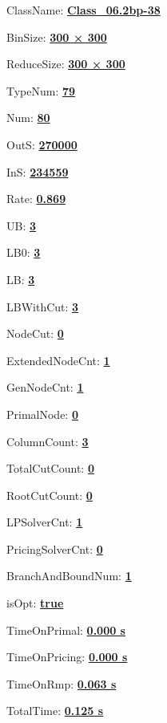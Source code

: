 \documentclass[11pt]{article}
\begin{document}
\pagestyle{empty}


ClassName: \underline{\textbf{Class_06.2bp-38}}
\par
BinSize: \underline{\textbf{300 × 300}}
\par
ReduceSize: \underline{\textbf{300 × 300}}
\par
TypeNum: \underline{\textbf{79}}
\par
Num: \underline{\textbf{80}}
\par
OutS: \underline{\textbf{270000}}
\par
InS: \underline{\textbf{234559}}
\par
Rate: \underline{\textbf{0.869}}
\par
UB: \underline{\textbf{3}}
\par
LB0: \underline{\textbf{3}}
\par
LB: \underline{\textbf{3}}
\par
LBWithCut: \underline{\textbf{3}}
\par
NodeCut: \underline{\textbf{0}}
\par
ExtendedNodeCnt: \underline{\textbf{1}}
\par
GenNodeCnt: \underline{\textbf{1}}
\par
PrimalNode: \underline{\textbf{0}}
\par
ColumnCount: \underline{\textbf{3}}
\par
TotalCutCount: \underline{\textbf{0}}
\par
RootCutCount: \underline{\textbf{0}}
\par
LPSolverCnt: \underline{\textbf{1}}
\par
PricingSolverCnt: \underline{\textbf{0}}
\par
BranchAndBoundNum: \underline{\textbf{1}}
\par
isOpt: \underline{\textbf{true}}
\par
TimeOnPrimal: \underline{\textbf{0.000 s}}
\par
TimeOnPricing: \underline{\textbf{0.000 s}}
\par
TimeOnRmp: \underline{\textbf{0.063 s}}
\par
TotalTime: \underline{\textbf{0.125 s}}
\par
\newpage
\end{document}

